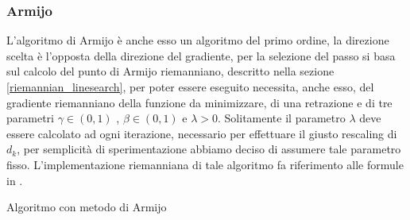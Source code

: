 \documentclass[a4paper, 12pt]{article}
\begin{document}
\subsubsection{Armijo}
L'algoritmo di Armijo è anche esso un algoritmo del primo ordine, la direzione scelta è l'opposta della direzione del gradiente, per la selezione del passo si basa sul calcolo del punto di Armijo riemanniano, descritto nella sezione \ref{riemannian_linesearch}, per poter essere eseguito necessita, anche esso, del gradiente riemanniano della funzione da minimizzare, di una retrazione e di tre parametri $\gamma \in (0,1)$ , $\beta \in (0,1)$ e $\lambda > 0$. Solitamente il parametro $\lambda$ deve essere calcolato ad ogni iterazione, necessario per effettuare il giusto rescaling di $d_k$, per semplicità di sperimentazione abbiamo deciso di assumere tale parametro fisso. L'implementazione riemanniana di tale algoritmo fa riferimento alle formule in \cite{Iannazzo}.\\
\begin{center}
\begin{algorithm}[H]
\SetAlgoLined
{}
\caption{Algoritmo con metodo di Armijo}
\end{algorithm}
\end{center}
\end{document}
